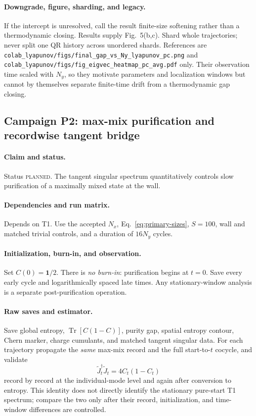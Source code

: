 \documentclass[aps,prx,onecolumn,nofootinbib,superscriptaddress,longbibliography]{revtex4-2}
\newcommand{\Id}{\mathbf{1}}
\newcommand{\qTr}{\operatorname{Tr}}
\newcommand{\code}[1]{\texttt{#1}}
\newcommand{\planned}{\textsc{planned}}
\begin{document}
\paragraph{Downgrade, figure, sharding, and legacy.}
If the intercept is unresolved, call the result finite-size softening rather than a
thermodynamic closing.  Results supply Fig.~5(b,c).  Shard whole trajectories; never split
one QR history across unordered shards.  References are
\code{colab\_lyapunov/figs/final\_gap\_vs\_Ny\_lyapunov\_pc.png} and
\code{colab\_lyapunov/figs/fig\_eigvec\_heatmap\_pc\_avg.pdf} only.  Their observation
time scaled with $N_y$, so they motivate parameters and localization windows but cannot by
themselves separate finite-time drift from a thermodynamic gap closing.

\subsection{Campaign P2: max-mix purification and recordwise tangent bridge}
\paragraph{Claim and status.}
Status \planned.  The tangent singular spectrum quantitatively controls slow purification
of a maximally mixed state at the wall.

\paragraph{Dependencies and run matrix.}
Depends on T1.  Use the accepted $N_x$, Eq.~\eqref{eq:primary-sizes}, $S=100$, wall and
matched trivial controls, and a duration of $16N_y$ cycles.

\paragraph{Initialization, burn-in, and observation.}
Set $C(0)=\Id/2$.  There is \emph{no burn-in}: purification begins at $t=0$.  Save every
early cycle and logarithmically spaced late times.  Any stationary-window analysis is a
separate post-purification operation.

\paragraph{Raw saves and estimator.}
Save global entropy, $\qTr[C(1-C)]$, purity gap, spatial entropy contour, Chern marker,
charge cumulants, and matched tangent singular data.  For each trajectory propagate the
\emph{same} max-mix record and the full start-to-$t$ cocycle, and validate
\begin{equation}
 \widetilde J_t^\dagger\widetilde J_t=4C_t(1-C_t)
 \label{eq:maxmix-record-bridge}
\end{equation}
record by record at the individual-mode level and again after conversion to entropy.  This
identity does not directly identify the stationary pure-start T1 spectrum; compare the two
only after their record, initialization, and time-window differences are controlled.
\end{document}
